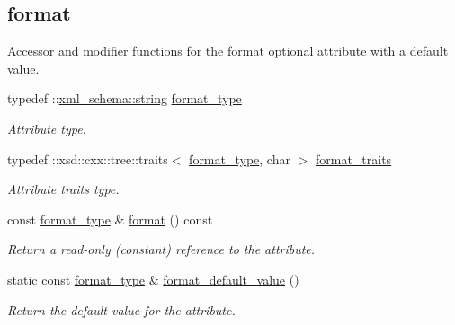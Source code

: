\subsection*{format}
\label{_amgrp1ddcb92ade31c8fbd370001f9b29a7d9}%
Accessor and modifier functions for the format optional attribute with a default value. \begin{DoxyCompactItemize}
\item 
typedef \+::\hyperlink{namespacexml__schema_aefbaf353f9a0043af46d23d9040ef268}{xml\+\_\+schema\+::string} \hyperlink{classDataArray__t_ae453ea653980baef2e3296005d70bfbd}{format\+\_\+type}
\begin{DoxyCompactList}\small\item\em Attribute type. \end{DoxyCompactList}\item 
typedef \+::xsd\+::cxx\+::tree\+::traits$<$ \hyperlink{classDataArray__t_ae453ea653980baef2e3296005d70bfbd}{format\+\_\+type}, char $>$ \hyperlink{classDataArray__t_a2a31ef3ce1dfa973843a02e17762e7a3}{format\+\_\+traits}
\begin{DoxyCompactList}\small\item\em Attribute traits type. \end{DoxyCompactList}\item 
const \hyperlink{classDataArray__t_ae453ea653980baef2e3296005d70bfbd}{format\+\_\+type} \& \hyperlink{classDataArray__t_a7a39cab4205282736e633d8a3c57bbae}{format} () const 
\begin{DoxyCompactList}\small\item\em Return a read-\/only (constant) reference to the attribute. \end{DoxyCompactList}\item 
static const \hyperlink{classDataArray__t_ae453ea653980baef2e3296005d70bfbd}{format\+\_\+type} \& \hyperlink{classDataArray__t_ade99ea2c2fdc45cc2826b6847dfb5404}{format\+\_\+default\+\_\+value} ()
\begin{DoxyCompactList}\small\item\em Return the default value for the attribute. \end{DoxyCompactList}\end{DoxyCompactItemize}
